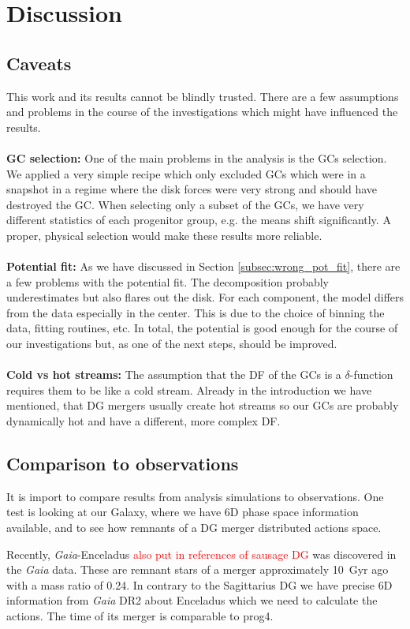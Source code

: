 \section{Discussion} \label{sec:Discussion}
\subsection{Caveats}
This work and its results cannot be blindly trusted. There are a few assumptions and problems in the course of the investigations which might have influenced the results.
\\\\\textbf{GC selection:}
One of the main problems in the analysis is the \acp{GC} selection. We applied a very simple recipe which only excluded \acp{GC} which were in a snapshot in a regime where the disk forces were very strong and should have destroyed the \ac{GC}. When selecting only a subset of the \acp{GC}, we have very different statistics of each progenitor group, e.g. the means shift significantly. A proper, physical selection would make these results more reliable. 
\\\\\textbf{Potential fit:}
As we have discussed in Section \ref{subsec:wrong_pot_fit}, there are a few problems with the potential fit. The decomposition probably underestimates but also flares out the disk. For each component, the model differs from the data especially in the center. This is due to the choice of binning the data, fitting routines, etc. In total, the potential is good enough for the course of our investigations but, as one of the next steps, should be improved.
\\\\\textbf{Cold vs hot streams:}
The assumption that the \ac{DF} of the \acp{GC} is a $\delta$-function requires them to be like a cold stream. Already in the introduction we have mentioned, that \ac{DG} mergers usually create hot streams so our \acp{GC} are probably dynamically hot and have a different, more complex \ac{DF}.
\textbf{}
\subsection{Comparison to observations}
It is import to compare results from analysis simulations to observations. One test is looking at our Galaxy, where we have 6D phase space information available, and to see how remnants of a \ac{DG} merger distributed actions space.

Recently, \textit{Gaia}-Enceladus \citep{Enceladus....Helmi...2018} \textcolor{red}{also put in references of sausage DG} was discovered in the \textit{Gaia} data. These are remnant stars of a merger approximately \SI{10}{Gyr} ago with a mass ratio of 0.24. In contrary to the Sagittarius \ac{DG} we have precise 6D information from \textit{Gaia} DR2 about Enceladus which we need to calculate the actions. The time of its merger is comparable to prog4.


